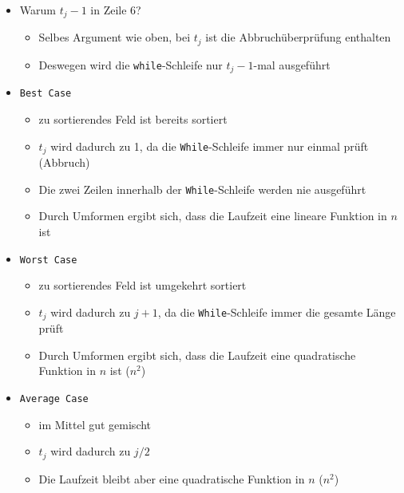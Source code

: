 \begin{itemize}
\begin{itemize}
                \item Warum $t_j-1$ in Zeile 6?
                    \begin{itemize}
                        \item Selbes Argument wie oben, bei $t_j$ ist die Abbruchüberprüfung enthalten
                        \item Deswegen wird die \texttt{while}-Schleife nur $t_j-1$-mal ausgeführt
                    \end{itemize}
                
                \item \texttt{Best Case}
                    \begin{itemize}
                        \item zu sortierendes Feld ist bereits sortiert 
                        \item $t_j$ wird dadurch zu 1, da die \texttt{While}-Schleife immer nur einmal prüft (Abbruch)
                        \item Die zwei Zeilen innerhalb der \texttt{While}-Schleife werden nie ausgeführt
                        \item Durch Umformen ergibt sich, dass die Laufzeit eine lineare Funktion in $n$ ist
                    \end{itemize}
                
                \item \texttt{Worst Case}
                    \begin{itemize}
                        \item zu sortierendes Feld ist umgekehrt sortiert 
                        \item $t_j$ wird dadurch zu $j+1$, da die \texttt{While}-Schleife immer die gesamte Länge prüft
                        \item Durch Umformen ergibt sich, dass die Laufzeit eine quadratische Funktion in $n$ ist ($n^2$)
                    \end{itemize}
                
                \item \texttt{Average Case} 
                    \begin{itemize}
                        \item im Mittel gut gemischt 
                        \item $t_j$ wird dadurch zu $j/2$
                        \item Die Laufzeit bleibt aber eine quadratische Funktion in $n$ ($n^2$)
                    \end{itemize}
            \end{itemize}
        

\end{itemize}

